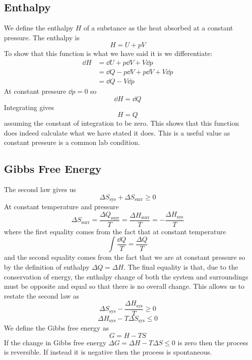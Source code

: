 \documentclass{article}
\begin{document}
    \subsection{Enthalpy}
    We define the enthalpy \(H\) of a substance as the heat absorbed at a constant pressure.
    The enthalpy is
    \[H = U + pV\]
    To show that this function is what we have said it is we differentiate:
    \begin{align*}
        \dd H &= \dd U + p\dd V + V\dd p\\
        &= \dd Q - p\dd V + p\dd V + V\dd p\\
        &= \dd Q - V\dd p
    \end{align*}
    At constant pressure \(\dd p = 0\) so
    \[\dd H = \dd Q\]
    Integrating gives
    \[H = Q\]
    assuming the constant of integration to be zero.
    This shows that this function does indeed calculate what we have stated it does.
    This is a useful value as constant pressure is a common lab condition.
    
    \subsection{Gibbs Free Energy}
    The second law gives us
    \[\Delta S_\text{sys} + \Delta S_\text{surr} \ge 0\]
    At constant temperature and pressure
    \[\Delta S_\text{surr} = \frac{\Delta Q_\text{surr}}{T} = \frac{\Delta H_\text{surr}}{T} = -\frac{\Delta H_\text{sys}}{T}\]
    where the first equality comes from the fact that at constant temperature
    \[\int \frac{\dd Q}{T} = \frac{\Delta Q}{T}\]
    and the second equality comes from the fact that we are at constant pressure so by the definition of enthalpy \(\Delta Q = \Delta H\).
    The final equality is that, due to the conservation of energy, the enthalpy change of both the system and surroundings must be opposite and equal so that there is no overall change.
    This allows us to restate the second law as
    \[\Delta S_\text{sys} - \frac{\Delta H_\text{sys}}{T} \ge 0\]
    \[\Delta H_\text{sys} - T\Delta S_\text{sys} \le 0\]
    We define the Gibbs free energy as
    \[G = H - TS\]
    If the change in Gibbs free energy \(\Delta G = \Delta H - T\Delta S \le 0\) is zero then the process is reversible.
    If instead it is negative then the process is spontaneous.
    
\end{document}
